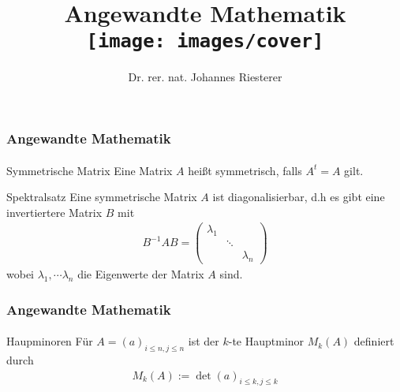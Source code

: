 \documentclass{beamer}
\begin{document}
\title[Angewandte Mathematik] %
{Angewandte Mathematik
\\
\texttt{[image: images/cover]}
}
\subtitle{}
\author[Dr. Johannes Riesterer] %
{Dr.  rer. nat. Johannes Riesterer}

\date[KPT 2004] %
{}

\subject{Angewandte Mathematik}

\frame{\titlepage}

\begin{frame}
    \frametitle{Angewandte Mathematik}
\framesubtitle{}
    \begin{block}{Symmetrische Matrix}
Eine Matrix $A$ heißt symmetrisch, falls $A^t = A$ gilt.
\end{block}

\begin{block}{Spektralsatz}
Eine symmetrische Matrix $A$ ist diagonalisierbar, d.h es gibt eine invertiertere Matrix $B$ mit 
\begin{align*}
B^{-1}A B = \begin{pmatrix}    \lambda_{1} & & \\
    & \ddots & \\
    & & \lambda_{n}\end{pmatrix}
\end{align*}
wobei $\lambda_1, \cdots \lambda_n$ die Eigenwerte der Matrix $A$ sind. 
\end{block}

 \end{frame}

\begin{frame}
    \frametitle{Angewandte Mathematik}
\framesubtitle{}


    \begin{block}{Haupminoren}
Für $A = (a)_{i \leq n,j \leq n}$ ist der $k$-te Hauptminor $M_k(A)$ definiert durch 
\begin{align*}
M_k(A) := \det(a)_{i \leq k, j \leq k}
\end{align*}

\end{block}

 \end{frame}
\end{document}
